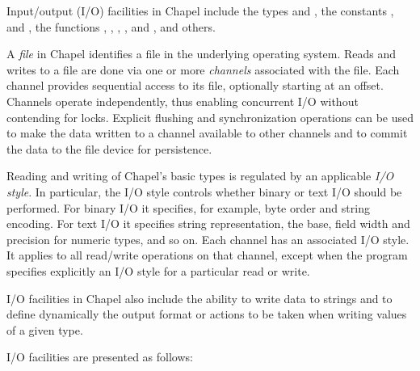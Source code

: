 \label{Input_and_Output}

Input/output (I/O) facilities in Chapel include
the types  and ,
the constants ,  and ,
the functions , , , ,
 and ,
and others.

A \emph{file} in Chapel identifies a file in the underlying operating system.
%
Reads and writes to a file are done via one or more \emph{channels}
associated with the file.
Each channel provides sequential access to its file, optionally
starting at an offset. Channels operate independently,
thus enabling concurrent I/O without contending for locks.
%
Explicit flushing and synchronization operations can be used
to make the data written to a channel available to other channels
and to commit the data to the file device for persistence.

Reading and writing of Chapel's basic types is regulated by
an applicable \emph{I/O style}.
In particular, the I/O style controls whether binary or text I/O
should be performed. For binary I/O it specifies, for example, byte order
and string encoding. For text I/O it specifies string representation,
the base, field width and precision for numeric types, and so on.
Each channel has an associated I/O style. It applies to
all read/write operations on that channel, except when the program
specifies explicitly an I/O style for a particular read or write.

I/O facilities in Chapel also include the ability to write data
to strings and to define dynamically the output format or actions
to be taken when writing values of a given type.

I/O facilities are presented as follows:

